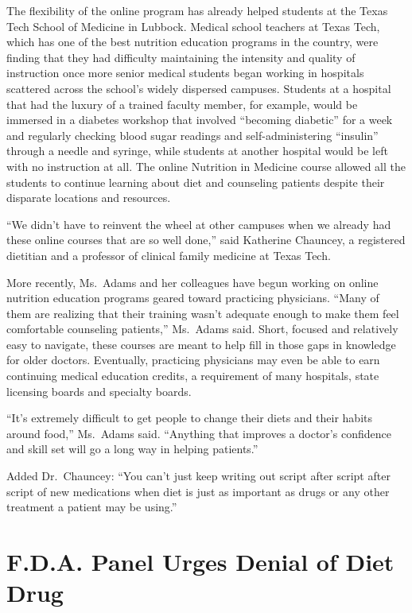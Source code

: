 ﻿\documentclass[12pt]{article}
\begin{document}
The flexibility of the online program has already helped students at the Texas Tech School of
Medicine in Lubbock. Medical school teachers at Texas Tech, which has one of the best nutrition
education programs in the country, were finding that they had difficulty maintaining the intensity
and quality of instruction once more senior medical students began working in hospitals scattered
across the school's widely dispersed campuses. Students at a hospital that had the luxury of a
trained faculty member, for example, would be immersed in a diabetes workshop that involved
``becoming diabetic'' for a week and regularly checking blood sugar readings and self-administering
``insulin'' through a needle and syringe, while students at another hospital would be left with no
instruction at all. The online Nutrition in Medicine course allowed all the students to continue
learning about diet and counseling patients despite their disparate locations and resources.

``We didn't have to reinvent the wheel at other campuses when we already had these online courses
that are so well done,'' said Katherine Chauncey, a registered dietitian and a professor of clinical
family medicine at Texas Tech.

More recently, Ms.~Adams and her colleagues have begun working on online nutrition education
programs geared toward practicing physicians. ``Many of them are realizing that their training
wasn't adequate enough to make them feel comfortable counseling patients,'' Ms.~Adams said. Short,
focused and relatively easy to navigate, these courses are meant to help fill in those gaps in
knowledge for older doctors. Eventually, practicing physicians may even be able to earn continuing
medical education credits, a requirement of many hospitals, state licensing boards and specialty
boards.

``It's extremely difficult to get people to change their diets and their habits around food,''
Ms.~Adams said. ``Anything that improves a doctor's confidence and skill set will go a long way in
helping patients.''

Added Dr.~Chauncey: ``You can't just keep writing out script after script after script of new
medications when diet is just as important as drugs or any other treatment a patient may be using.''

\pagebreak
\section{F.D.A. Panel Urges Denial of Diet Drug}
\end{document}
